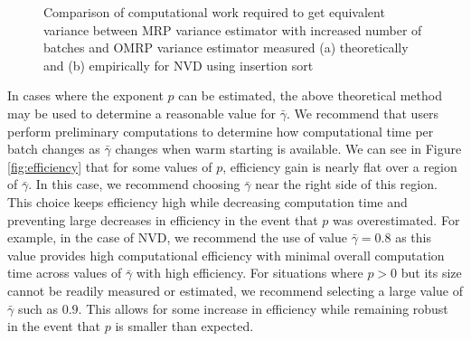 \documentclass[12pt]{article}
\newcommand{\gammab}{\bar{\gamma}}
\begin{document}
\begin{figure}[htb!]
	\centering
		\caption{
		Comparison of computational work required to get equivalent variance between MRP variance estimator with increased number of batches and OMRP variance estimator measured
		(a) theoretically and 
		(b) empirically for NVD using insertion sort
		}
\label{fig:comp_work_comparison}
\end{figure}


In cases where the exponent $p$ can be estimated, the above theoretical method may be used to determine a reasonable value for $\gammab$.
We recommend that users perform preliminary computations to determine how computational time per batch changes as $\gammab$ changes when warm starting is available. 
We can see in Figure \ref{fig:efficiency} that for some values of $p$, efficiency gain is nearly flat over a region of $\gammab$.
In this case, we recommend choosing $\gammab$ near the right side of this region.
This choice keeps efficiency high while decreasing computation time and preventing large decreases in efficiency in the event that $p$ was overestimated.
For example, in the case of NVD, we recommend the use of value $\gammab=0.8$ as this value provides high computational efficiency with minimal overall computation time across values of $\gammab$ with high efficiency. 
For situations where $p > 0$ but its size cannot be readily measured or estimated, we recommend selecting a large value of $\gammab$ such as $0.9$.
This allows for some increase in efficiency while remaining robust in the event that $p$ is smaller than expected.
\end{document}
